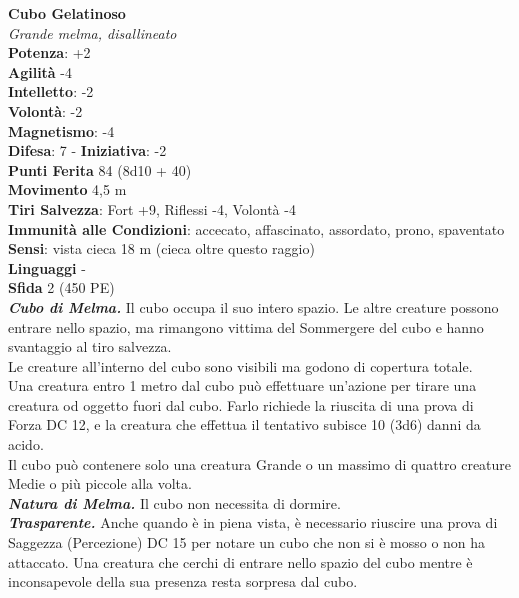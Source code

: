 \begin{multicols}{2}
\medskip\textbf{Cubo Gelatinoso}\\
\emph{Grande melma, disallineato}\\
\textbf{Potenza}: +2\\
\textbf{Agilità} -4\\
\textbf{Intelletto}: -2\\
\textbf{Volontà}: -2\\
\textbf{Magnetismo}: -4\\
\textbf{Difesa}: 7 - \textbf{Iniziativa}: -2\\
\textbf{Punti Ferita} 84 (8d10 + 40)\\
\textbf{Movimento} 4,5 m\\
\textbf{Tiri Salvezza}: Fort +9, Riflessi -4, Volontà -4\\
\textbf{Immunità alle Condizioni}: accecato, affascinato, assordato, prono, spaventato\\
\textbf{Sensi}: vista cieca 18 m (cieca oltre questo raggio)\\
\textbf{Linguaggi} -\\
\textbf{Sfida} 2 (450 PE)\smallskip\\
\emph{\textbf{Cubo di Melma.}} Il cubo occupa il suo intero spazio. Le altre creature possono entrare nello spazio, ma rimangono vittima del Sommergere del cubo e hanno svantaggio al tiro salvezza.\\

Le creature all'interno del cubo sono visibili ma godono di copertura totale.\\

Una creatura entro 1 metro dal cubo può effettuare un'azione per tirare una creatura od oggetto fuori dal cubo. Farlo richiede la riuscita di una prova di Forza DC 12, e la creatura che effettua il tentativo subisce 10 (3d6) danni da acido.\\

Il cubo può contenere solo una creatura Grande o un massimo di quattro creature Medie o più piccole alla volta.\\

\emph{\textbf{Natura di Melma.}} Il cubo non necessita di dormire.\\

\emph{\textbf{Trasparente.}} Anche quando è in piena vista, è necessario riuscire una prova di Saggezza (Percezione) DC 15 per notare un cubo che non si è mosso o non ha attaccato. Una creatura che cerchi di entrare nello spazio del cubo mentre è inconsapevole della sua presenza resta sorpresa dal cubo.\\


\end{multicols}
